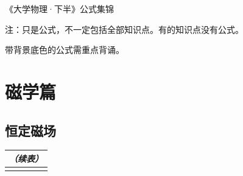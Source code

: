 \documentclass[UTF8]{ctexart}
\begin{document}
\begin{center}\color{cyan!50!black}
    《大学物理·下半》公式集锦

    注：只是公式，不一定包括全部知识点。有的知识点没有公式。

    带背景底色的公式需重点背诵。
\end{center}

\section{磁学篇}
\subsection{恒定磁场}
\begin{longtable}{|p{}|p{}|}
    \multicolumn{2}{r}{\textit{（续表）}} \\
    \hline
\endhead
    \hline
\endfirsthead
\endfoot
    \hline
\endlastfoot


\end{longtable}
\end{document}
